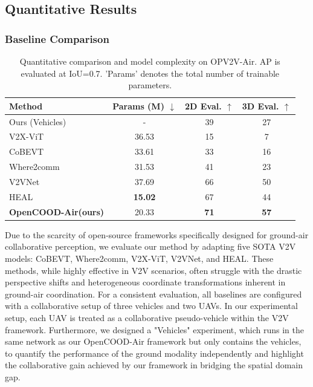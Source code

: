 \documentclass[conference]{IEEEtran}
\begin{document}
\subsection{Quantitative Results}
\subsubsection{Baseline Comparison}

\begin{table}[t]
\centering
\caption{Quantitative comparison and model complexity on OPV2V-Air. AP is evaluated at IoU=0.7. 'Params' denotes the total number of trainable parameters.}
\label{tab:eval_results}
\begin{tabular*}{\columnwidth}{@{\extracolsep{\fill}}lccc@{\extracolsep{\fill}}}
\toprule
Method & Params (M) $\downarrow$ & 2D Eval. $\uparrow$ & 3D Eval. $\uparrow$ \\
\midrule
Ours (Vehicles) & - & 39 & 27 \\
\midrule
V2X-ViT \cite{xu2022v2x} & 36.53 & 15 & 7 \\
CoBEVT \cite{xucobevt} & 33.61 & 33 & 16 \\
Where2comm \cite{hu2022where2comm} & 31.53 & 41 & 23 \\
V2VNet \cite{wang2020v2vnet} & 37.69 & 66 & 50 \\
HEAL \cite{luextensible} & \textbf{15.02} & 67 & 44 \\
\textbf{OpenCOOD-Air(ours)} & 20.33 & \textbf{71} & \textbf{57} \\
\bottomrule
\end{tabular*}
\end{table}

Due to the scarcity of open-source frameworks specifically designed for ground-air collaborative perception, we evaluate our method by adapting five SOTA V2V models: CoBEVT, Where2comm, V2X-ViT, V2VNet, and HEAL. These methods, while highly effective in V2V scenarios, often struggle with the drastic perspective shifts and heterogeneous coordinate transformations inherent in ground-air coordination. For a consistent evaluation, all baselines are configured with a collaborative setup of three vehicles and two UAVs. In our experimental setup, each UAV is treated as a collaborative pseudo-vehicle within the V2V framework. Furthermore, we designed a "Vehicles" experiment, which runs in the same network as our OpenCOOD-Air framework but only contains the vehicles, to quantify the performance of the ground modality independently and highlight the collaborative gain achieved by our framework in bridging the spatial domain gap.
\end{document}
